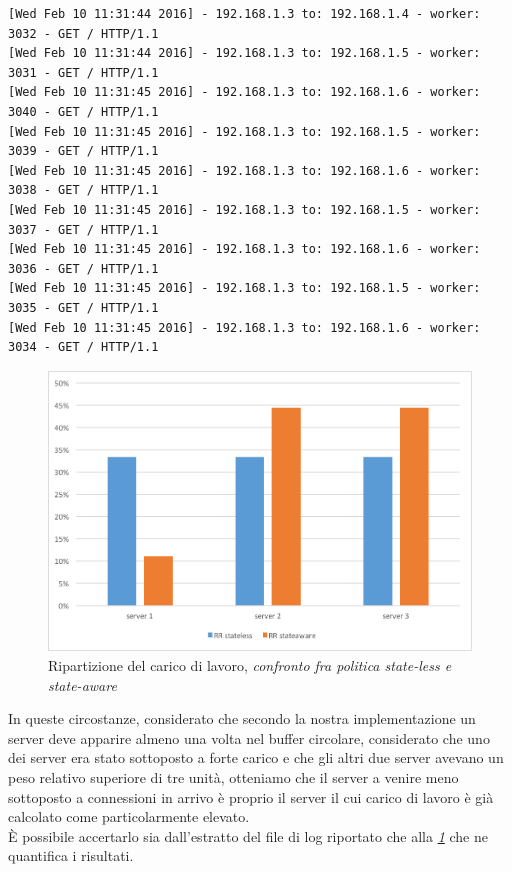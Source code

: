 \documentclass[italian]{tktltiki2}
\begin{document}
\begin{lstlisting}[basicstyle=\fontsize{6.4}{7}\selectfont\ttfamily]
[Wed Feb 10 11:31:44 2016] - 192.168.1.3 to: 192.168.1.4 - worker: 3032 - GET / HTTP/1.1
[Wed Feb 10 11:31:44 2016] - 192.168.1.3 to: 192.168.1.5 - worker: 3031 - GET / HTTP/1.1
[Wed Feb 10 11:31:45 2016] - 192.168.1.3 to: 192.168.1.6 - worker: 3040 - GET / HTTP/1.1
[Wed Feb 10 11:31:45 2016] - 192.168.1.3 to: 192.168.1.5 - worker: 3039 - GET / HTTP/1.1
[Wed Feb 10 11:31:45 2016] - 192.168.1.3 to: 192.168.1.6 - worker: 3038 - GET / HTTP/1.1
[Wed Feb 10 11:31:45 2016] - 192.168.1.3 to: 192.168.1.5 - worker: 3037 - GET / HTTP/1.1
[Wed Feb 10 11:31:45 2016] - 192.168.1.3 to: 192.168.1.6 - worker: 3036 - GET / HTTP/1.1
[Wed Feb 10 11:31:45 2016] - 192.168.1.3 to: 192.168.1.5 - worker: 3035 - GET / HTTP/1.1
[Wed Feb 10 11:31:45 2016] - 192.168.1.3 to: 192.168.1.6 - worker: 3034 - GET / HTTP/1.1
\end{lstlisting}
\begin{figure}[H]
\centering
\includegraphics[width=\textwidth]{images/round_robin_cfr}
\caption{Ripartizione del carico di lavoro, \emph{confronto fra politica state-less e state-aware}\label{fig: rrobin_cfr}}
\end{figure}
In queste circostanze, considerato che secondo la nostra implementazione un server deve apparire almeno una volta nel buffer circolare, considerato che uno dei server era stato sottoposto a forte carico e che gli altri due server avevano un peso relativo superiore di tre unità, otteniamo che il server a venire meno sottoposto a connessioni in arrivo è proprio il server il cui carico di lavoro è già calcolato come particolarmente elevato.
\\
È possibile accertarlo sia dall'estratto del file di log riportato che alla \emph{\ref{fig: rrobin_cfr}} che ne quantifica i risultati.
\end{document}
